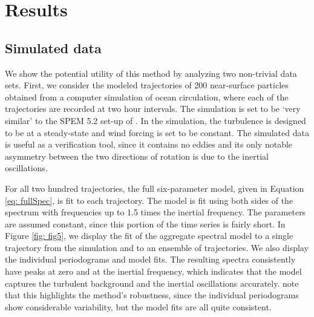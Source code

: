 \documentclass{stat572Style}
\begin{document}
\section{Results}
\subsection{Simulated data}
\par We show the potential utility of this method by analyzing two non-trivial data sets.  
First, we consider the modeled trajectories of 200 near-surface particles obtained from a computer simulation of ocean circulation, where each of the trajectories are recorded at two hour intervals. 
The simulation is set to be `very similar' to the SPEM 5.2 set-up of \citet{Danioux2008}. 
In the  simulation, the turbulence is designed to be at a steady-state and wind forcing is set to be  constant. 
The simulated data is useful as a verification tool, since  it contains no eddies and its only  notable asymmetry between the two directions of rotation is due to the inertial oscillations. 


\par For all two hundred trajectories, the full six-parameter model, given in Equation \eqref{eq: fullSpec}, is fit to each trajectory. 
The model is fit using both sides of the spectrum with frequencies up to 1.5 times the inertial frequency. 
The parameters are assumed constant, since this portion of the time series  is fairly short. 
In Figure \ref{fig: fig5}, we display the fit of the aggregate spectral model to a single trajectory from the simulation and to an ensemble of trajectories. 
We also display the individual periodograms and model fits. 
The resulting spectra consistently have peaks at zero and at the inertial frequency, which indicates that the model captures the turbulent background and the inertial oscillations accurately. 
\citet{Sykulski2016}  note that this highlights the method's robustness, since the individual periodograms show considerable variability, but the model fits are all quite consistent.
\end{document}
